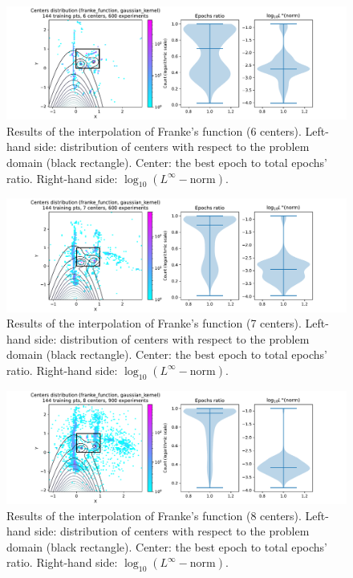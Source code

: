 \documentclass[12pt]{report} %
\begin{document}
\begin{figure}[H]
  \includegraphics[width=\textwidth, trim={2cm 0 2.8cm 0}, clip=true]{imagenes/experiments/2d/franke_interpolation/tr12_c6_franke_function_gaussian_kernel.pdf}
  \caption{Results of the interpolation of Franke's function (6 centers).
    Left-hand side: distribution of centers with respect to the problem domain (black rectangle). Center: the best epoch to total epochs' ratio.
    Right-hand side: $\log_{10}(L^\infty-\text{norm})$.}
  \label{fig:franke-tr12-c6}
\end{figure}
\begin{figure}[H]
  \includegraphics[width=\textwidth, trim={2cm 0 2.8cm 0}, clip=true]{imagenes/experiments/2d/franke_interpolation/tr12_c7_franke_function_gaussian_kernel.pdf}
  \caption{Results of the interpolation of Franke's function (7 centers).
    Left-hand side: distribution of centers with respect to the problem domain (black rectangle). Center: the best epoch to total epochs' ratio.
    Right-hand side: $\log_{10}(L^\infty-\text{norm})$.}
  \label{fig:franke-tr12-c7}
\end{figure}
\begin{figure}[H]
  \includegraphics[width=\textwidth, trim={2cm 0 2.8cm 0}, clip=true]{imagenes/experiments/2d/franke_interpolation/tr12_c8_franke_function_gaussian_kernel.pdf}
  \caption{Results of the interpolation of Franke's function (8 centers).
    Left-hand side: distribution of centers with respect to the problem domain (black rectangle). Center: the best epoch to total epochs' ratio.
    Right-hand side: $\log_{10}(L^\infty-\text{norm})$.}
  \label{fig:franke-tr12-c8}
\end{figure}
\end{document}
